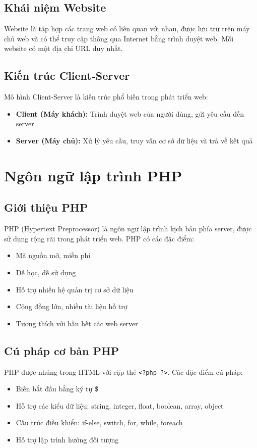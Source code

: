 \documentclass[a4paper,13pt]{extreport}
\begin{document}
\subsection{Khái niệm Website}
Website là tập hợp các trang web có liên quan với nhau, được lưu trữ trên máy chủ web và có thể truy cập thông qua Internet bằng trình duyệt web. Mỗi website có một địa chỉ URL duy nhất.

\subsection{Kiến trúc Client-Server}
Mô hình Client-Server là kiến trúc phổ biến trong phát triển web:
\begin{itemize}
    \item \textbf{Client (Máy khách):} Trình duyệt web của người dùng, gửi yêu cầu đến server
    \item \textbf{Server (Máy chủ):} Xử lý yêu cầu, truy vấn cơ sở dữ liệu và trả về kết quả
\end{itemize}

\section{Ngôn ngữ lập trình PHP}

\subsection{Giới thiệu PHP}
PHP (Hypertext Preprocessor) là ngôn ngữ lập trình kịch bản phía server, được sử dụng rộng rãi trong phát triển web. PHP có các đặc điểm:
\begin{itemize}
    \item Mã nguồn mở, miễn phí
    \item Dễ học, dễ sử dụng
    \item Hỗ trợ nhiều hệ quản trị cơ sở dữ liệu
    \item Cộng đồng lớn, nhiều tài liệu hỗ trợ
    \item Tương thích với hầu hết các web server
\end{itemize}

\subsection{Cú pháp cơ bản PHP}
PHP được nhúng trong HTML với cặp thẻ \texttt{<?php ?>}. Các đặc điểm cú pháp:
\begin{itemize}
    \item Biến bắt đầu bằng ký tự \$
    \item Hỗ trợ các kiểu dữ liệu: string, integer, float, boolean, array, object
    \item Cấu trúc điều khiển: if-else, switch, for, while, foreach
    \item Hỗ trợ lập trình hướng đối tượng
\end{itemize}
\end{document}
